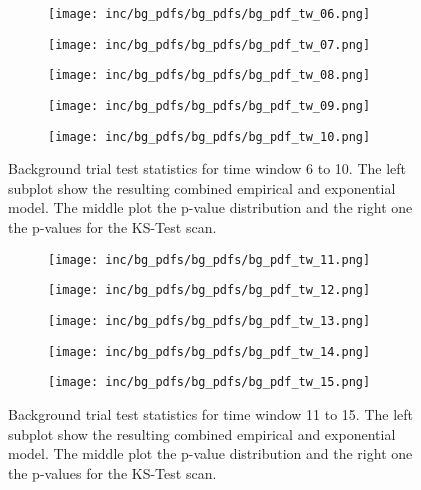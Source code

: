 \begin{figure}[htpb]
  \begin{subfigure}[c]{\textwidth}
    \texttt{[image: inc/bg\_pdfs/bg\_pdfs/bg\_pdf\_tw\_06.png]}
  \end{subfigure}
  \begin{subfigure}[c]{\textwidth}
    \texttt{[image: inc/bg\_pdfs/bg\_pdfs/bg\_pdf\_tw\_07.png]}
  \end{subfigure}
  \begin{subfigure}[c]{\textwidth}
    \texttt{[image: inc/bg\_pdfs/bg\_pdfs/bg\_pdf\_tw\_08.png]}
  \end{subfigure}
  \begin{subfigure}[c]{\textwidth}
    \texttt{[image: inc/bg\_pdfs/bg\_pdfs/bg\_pdf\_tw\_09.png]}
  \end{subfigure}
  \begin{subfigure}[c]{\textwidth}
    \texttt{[image: inc/bg\_pdfs/bg\_pdfs/bg\_pdf\_tw\_10.png]}
  \end{subfigure}
  \caption{Background trial test statistics for time window 6 to 10. The left subplot show the resulting combined empirical and exponential model. The middle plot the p-value distribution and the right one the p-values for the KS-Test scan.}
\end{figure}

\begin{figure}[htpb]
  \begin{subfigure}[c]{\textwidth}
    \texttt{[image: inc/bg\_pdfs/bg\_pdfs/bg\_pdf\_tw\_11.png]}
  \end{subfigure}
  \begin{subfigure}[c]{\textwidth}
    \texttt{[image: inc/bg\_pdfs/bg\_pdfs/bg\_pdf\_tw\_12.png]}
  \end{subfigure}
  \begin{subfigure}[c]{\textwidth}
    \texttt{[image: inc/bg\_pdfs/bg\_pdfs/bg\_pdf\_tw\_13.png]}
  \end{subfigure}
  \begin{subfigure}[c]{\textwidth}
    \texttt{[image: inc/bg\_pdfs/bg\_pdfs/bg\_pdf\_tw\_14.png]}
  \end{subfigure}
  \begin{subfigure}[c]{\textwidth}
    \texttt{[image: inc/bg\_pdfs/bg\_pdfs/bg\_pdf\_tw\_15.png]}
  \end{subfigure}
  \caption{Background trial test statistics for time window 11 to 15. The left subplot show the resulting combined empirical and exponential model. The middle plot the p-value distribution and the right one the p-values for the KS-Test scan.}
\end{figure}

